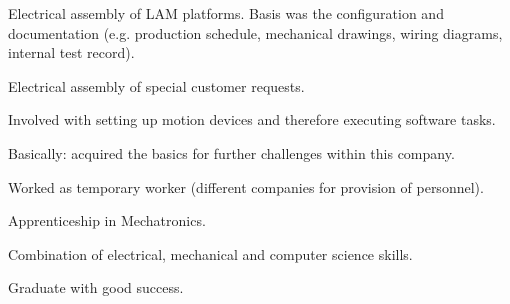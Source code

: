\documentclass[]{resume}
\begin{document}
\begin{minipage}[t]{0.66\textwidth}
	\begin{tightemize}
		
		\item Electrical assembly of LAM platforms. Basis was the configuration and documentation (e.g. production schedule, mechanical drawings, wiring diagrams, internal test record).
		\item Electrical assembly of special customer requests.
		\item Involved with setting up motion devices and therefore executing software tasks.
		
	\end{tightemize}
	\sectionsep
	\begin{tightemize}
		
	\item Basically: acquired the basics for further challenges within this company. 
	\item Worked as temporary worker (different companies for provision of personnel).
	
	\end{tightemize}
	\sectionsep
	\begin{tightemize}

		\item Apprenticeship in Mechatronics.
		\item Combination of electrical, mechanical and computer science skills.
		\item Graduate with good success.
		
	\end{tightemize}
	\sectionsep
\end{minipage} 
\vfill \vfill \vfill \vfill
\pagebreak


\end{document}
